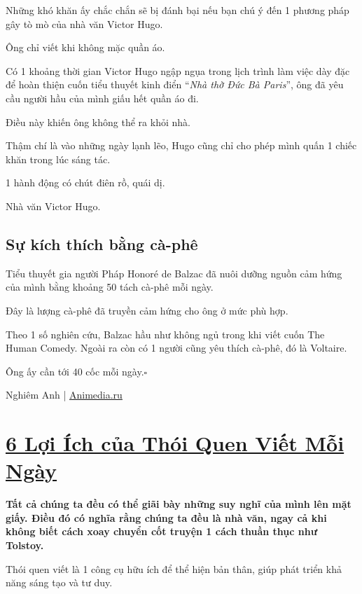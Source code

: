\documentclass{book}
\numberwithin{equation}{section}
\begin{document}
Những khó khăn ấy chắc chắn sẽ bị đánh bại nếu bạn chú ý đến 1 phương pháp gây tò mò của nhà văn Victor Hugo.

Ông chỉ viết khi không mặc quần áo.

Có 1 khoảng thời gian Victor Hugo ngập ngụa trong lịch trình làm việc dày đặc để hoàn thiện cuốn tiểu thuyết kinh điển ``\textit{Nhà thờ Đức Bà Paris}'', ông đã yêu cầu người hầu của mình giấu hết quần áo đi.

Điều này khiến ông không thể ra khỏi nhà.

Thậm chí là vào những ngày lạnh lẽo, Hugo cũng chỉ cho phép mình quấn 1 chiếc khăn trong lúc sáng tác.

1 hành động có chút điên rồ, quái dị.

\textsf{Nhà văn Victor Hugo.}

\section{Sự kích thích bằng cà-phê}
Tiểu thuyết gia người Pháp Honoré de Balzac đã nuôi dưỡng nguồn cảm hứng của mình bằng khoảng 50 tách cà-phê mỗi ngày.

Đây là lượng cà-phê đã truyền cảm hứng cho ông ở mức phù hợp.

Theo 1 số nghiên cứu, Balzac hầu như không ngủ trong khi viết cuốn The Human Comedy. Ngoài ra còn có 1 người cũng yêu thích cà-phê, đó là Voltaire.

Ông ấy cần tới 40 cốc mỗi ngày.\hfill$\square$

\begin{flushright}
    Nghiêm Anh | \url{Animedia.ru}
\end{flushright}


\chapter{\href{http://tramdoc.vn/tin-tuc/6-loi-ich-cua-thoi-quen-viet-moi-ngay-nzG1AW.html}{6 Lợi Ích của Thói Quen Viết Mỗi Ngày}}

\textbf{Tất cả chúng ta đều có thể giãi bày những suy nghĩ của mình lên mặt giấy. Điều đó có nghĩa rằng chúng ta đều là nhà văn, ngay cả khi không biết cách xoay chuyển cốt truyện 1 cách thuần thục như Tolstoy.}

%
Thói quen viết là 1 công cụ hữu ích để thể hiện bản thân, giúp phát triển khả năng sáng tạo và tư duy.
\end{document}
